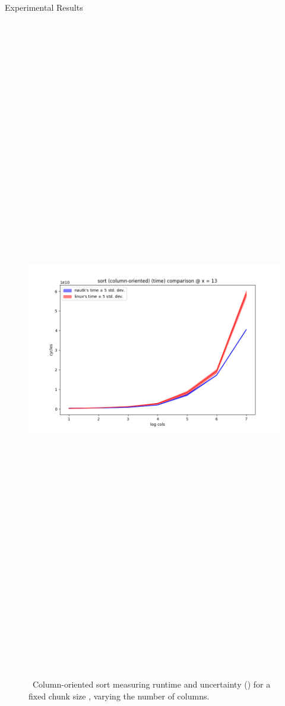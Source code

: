 \begin{block}{Experimental Results}
  \begin{figure}
    \includegraphics[height=30cm]{plots/sort.png}
    \caption{~Column-oriented sort measuring runtime and uncertainty () for a fixed chunk size , varying the number of columns.}
    \label{fig:sort}
  \end{figure}


\end{block}
